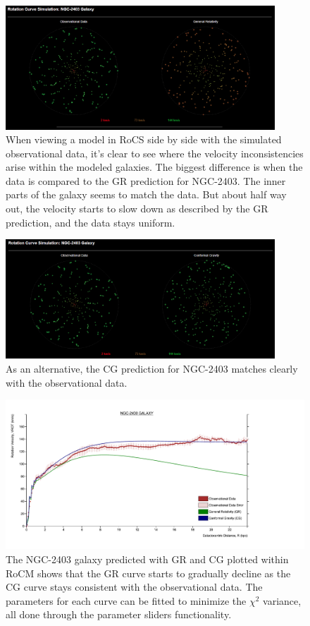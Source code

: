 \documentclass[conference]{IEEEtran-modified}
\begin{document}
\begin{figure}[h!]
\centering
\includegraphics[width=0.9\textwidth]{NGC-2403-GR}
\caption{When viewing a model in RoCS side by side with the simulated observational data, it's clear to see where the velocity inconsistencies arise within the modeled galaxies. The biggest difference is when the data is compared to the GR prediction for NGC-2403. The inner parts of the galaxy seems to match the data. But about half way out, the velocity starts to slow down as described by the GR prediction, and the data stays uniform.}
\label{ngc2403gr}
\end{figure}


\begin{figure}[h!]
\centering
\includegraphics[width=0.9\textwidth]{NGC-2403-CG}
\caption{As an alternative, the CG prediction for NGC-2403 matches clearly with the observational data.}
\label{ngc2403cg}
\end{figure}


\begin{figure}[h!]
\centering
\includegraphics[width=\textwidth]{NGC-2403}
\caption{The NGC-2403 galaxy predicted with GR and CG plotted within RoCM shows that the GR curve starts to gradually decline as the CG curve stays consistent with the observational data. The parameters for each curve can be fitted to minimize the $\chi^2$ variance, all done through the parameter sliders functionality.}
\label{ngc2403plot}
\end{figure}
\end{document}
